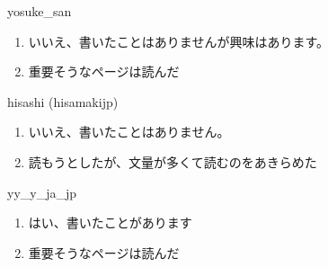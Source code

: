 \begin{prework}{ yosuke\_san }
  \begin{enumerate}
  \item いいえ、書いたことはありませんが興味はあります。
  \item 重要そうなページは読んだ
  \end{enumerate}
\end{prework}

\begin{prework}{ hisashi (hisamakijp) }
  \begin{enumerate}
  \item いいえ、書いたことはありません。
  \item 読もうとしたが、文量が多くて読むのをあきらめた
  \end{enumerate}
\end{prework}

\begin{prework}{ yy\_y\_ja\_jp }
  \begin{enumerate}
  \item はい、書いたことがあります
  \item 重要そうなページは読んだ
  \end{enumerate}
\end{prework}
